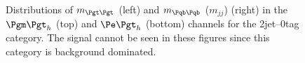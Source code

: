 \begin{figure}
\begin{center}

\end{center}
\caption[Distributions of $m_{\Pgt\Pgt}$ (left) and $m_{jj}$ (right) in the $\mutau$ (top) and
$\etau$ (bottom) channels for the 2jet--0tag category.]{
Distributions of $m_{\Pgt\Pgt}$ (left) and $m_{\Pqb\Pqb}$ ($m_{jj}$) (right) in the $\mutau$ (top) and
$\etau$ (bottom) channels for the 2jet--0tag category. The signal cannot be seen
in these figures since this category is background dominated.}
\label{fig:2jet0tagmttmbb}
\end{figure} 

